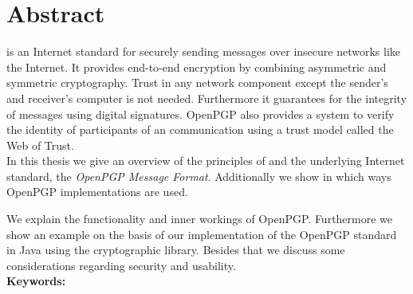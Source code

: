 

\chapter*{Abstract}
\label{cha:abstract}


 is an Internet standard for securely sending messages over insecure networks like the Internet. It provides end-to-end encryption by combining asymmetric and symmetric cryptography. Trust in any network component except the sender's and receiver's computer is not needed. Furthermore it guarantees for the integrity of messages using digital signatures. OpenPGP also provides a system to verify the identity of participants of an communication using a trust model called the Web of Trust. \\


In this thesis we give an overview of the principles of  and the underlying Internet standard, the \textit{OpenPGP Message Format}. 
Additionally we show in which ways OpenPGP implementations are used.

We explain the functionality and inner workings of OpenPGP. Furthermore we show an example on the basis of our implementation of the OpenPGP standard in Java using the  cryptographic library.
Besides that we discuss some considerations regarding security and usability. 
\\



\textbf{Keywords:} \mykeywords

